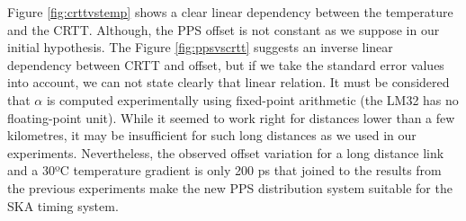 Figure \ref{fig:crttvstemp} shows a clear linear dependency between the 
temperature and the CRTT. Although, the PPS offset is not constant as 
we suppose in our initial hypothesis. The Figure \ref{fig:ppsvscrtt} suggests 
an inverse linear dependency between CRTT and offset, but if we take the 
standard error values into account, we can not state clearly that linear 
relation. It must be considered that $\alpha$ is computed experimentally using 
fixed-point arithmetic (the LM32 has no floating-point unit). While it seemed 
to work right for distances lower than a few kilometres, it may be insufficient 
for such long distances as we used in our experiments. Nevertheless, the 
observed offset variation for a long distance link and a 30ºC temperature 
gradient is only 200 ps that joined to the results from the previous 
experiments make the new PPS distribution system suitable for the SKA 
timing system.